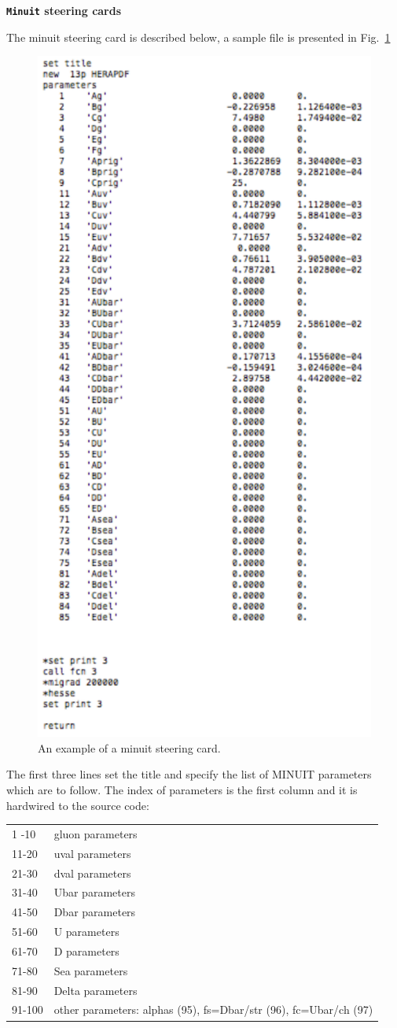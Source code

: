 \begin{description}
\item \bf {{\tt Minuit} steering cards}\rm


The minuit steering card is described below, a sample file is presented 
in Fig.~\ref{fig:minuit}
\begin{figure}
\begin{center}
\includegraphics[width=0.45\linewidth]{figures/minuit.pdf}
\end{center}
\caption{An example of a minuit steering card.}
\label{fig:minuit}
\end{figure}

The first three lines set the title and specify the list of MINUIT parameters which are to follow.      
The index of parameters is the first column and it is hardwired to the source code:\\

\begin{tabular}{ll}
1 -10 & gluon parameters \\    
11-20 & uval  parameters \\
21-30 & dval  parameters \\
31-40 & Ubar  parameters \\
41-50 & Dbar  parameters \\
51-60 & U     parameters \\
61-70 & D     parameters \\
71-80 & Sea   parameters \\
81-90 &Delta parameters \\
91-100 & other parameters: alphas (95), fs=Dbar/str (96), fc=Ubar/ch (97)\\
\end{tabular}


\end{description}
